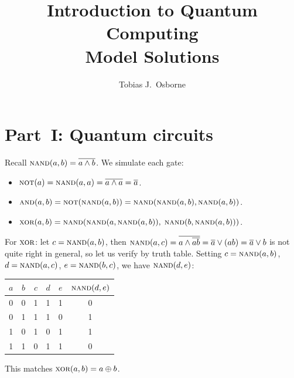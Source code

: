 \documentclass[12pt,oneside]{amsart}
\title[Introduction to Quantum Computing --- Solutions]{Introduction to Quantum Computing\\[0.5em]
{\large Model Solutions}}
\author{Tobias J.\ Osborne}
\date{}
\begin{document}
\maketitle

\section*{Part~I: Quantum circuits}
\setcounter{section}{1}
\setcounter{exercise}{0}

\begin{exercise}
\end{exercise}
\begin{solution}
  Recall $\textsc{nand}(a,b) = \overline{a \wedge b}$.  We simulate each gate:
  \begin{itemize}
    \item $\textsc{not}(a) = \textsc{nand}(a,a) = \overline{a\wedge a} = \overline{a}$.
    \item $\textsc{and}(a,b) = \textsc{not}(\textsc{nand}(a,b)) = \textsc{nand}(\textsc{nand}(a,b),\textsc{nand}(a,b))$.
    \item $\textsc{xor}(a,b) = \textsc{nand}(\textsc{nand}(a, \textsc{nand}(a,b)),\; \textsc{nand}(b, \textsc{nand}(a,b)))$.
  \end{itemize}
  For $\textsc{xor}$: let $c = \textsc{nand}(a,b)$, then $\textsc{nand}(a,c) = \overline{a\wedge\overline{ab}} = \overline{a}\vee (ab) = \overline{a}\vee b$ is not quite right in general, so let us verify by truth table.  Setting $c=\textsc{nand}(a,b)$, $d=\textsc{nand}(a,c)$, $e=\textsc{nand}(b,c)$, we have $\textsc{nand}(d,e)$:
  \begin{center}
    \begin{tabular}{cc|cccc}
      \toprule
      $a$ & $b$ & $c$ & $d$ & $e$ & $\textsc{nand}(d,e)$ \\
      \midrule
      0 & 0 & 1 & 1 & 1 & 0 \\
      0 & 1 & 1 & 1 & 0 & 1 \\
      1 & 0 & 1 & 0 & 1 & 1 \\
      1 & 1 & 0 & 1 & 1 & 0 \\
      \bottomrule
    \end{tabular}
  \end{center}
  This matches $\textsc{xor}(a,b) = a\oplus b$. \qedhere
\end{solution}
\end{document}

